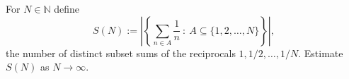 For $N\in\mathbb{N}$ define
\[
S(N):=\left|\left\{\sum_{n\in A}\frac{1}{n}\ :\ A\subseteq \{1,2,\dots,N\}\right\}\right|,
\]
the number of distinct subset sums of the reciprocals $1,1/2,\dots,1/N$.
Estimate $S(N)$ as $N\to\infty$.
